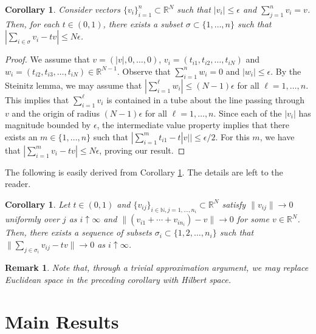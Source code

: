 \documentclass[11pt]{amsart}
\newtheorem{corollary}[theorem]{Corollary}
\newtheorem{remark}[theorem]{Remark}
\begin{document}
\begin{corollary}\label{ST_corollary}
Consider vectors $\{v_{i} \}_{i=1}^{n} \subset \mathbb{R}^{N}$ such that $|v_{i}|\leq \epsilon$ and
$\sum_{j=1}^{n}v_{i} = v$. Then, for each $t\in (0,1)$, there exists a subset $\sigma \subset \{1,\ldots,n \}$ such that
$| \sum_{i \in \sigma} v_{i} - tv | \leq N \epsilon$.
\end{corollary}
\begin{proof}
We assume that $v=(|v|,0,\ldots,0)$, $v_{i} = (t_{i1},t_{i2},\ldots,t_{iN})$ 
and $w_{i} = (t_{i2},t_{i3}, \ldots, t_{iN}) \in \mathbb{R}^{N-1}$.  Observe that $\sum_{i=1}^{n}w_{i} = 0$ and $|w_{i}|\leq \epsilon$.
By the Steinitz lemma, we may assume that $|\sum_{i=1}^{\ell}w_{i}|\leq (N-1)\epsilon$ for all $\ell =1,\ldots,n$.
This implies that $\sum_{i=1}^{\ell}v_{i}$ is contained in a tube about the line passing through $v$ and the origin
of radius $(N-1)\epsilon$ for all $\ell = 1,\ldots,n$.  Since each of the $|v_{i}|$ has magnitude bounded by $\epsilon$,
the intermediate value property implies that there exists an $m \in \{1,\ldots,n \}$ such that 
$|\sum_{i=1}^{m}t_{i1} - t|v|| \leq \epsilon/2$.  For this $m$, we have that $|\sum_{i=1}^{m} v_{i} - tv| \leq N\epsilon$,
proving our result.
\end{proof}

The following is easily derived from Corollary \ref{ST_corollary}.  The details are left to the reader.

\begin{corollary}\label{ST_euclidean}
Let $t\in (0,1)$ and $\{v_{ij} \}_{i\in\mathbb{N}, j=1,\ldots,n_{i}} \subset \mathbb{R}^{N}$ satisfy
$\|v_{ij}\| \rightarrow 0$ uniformly over $j$ as $i\uparrow \infty$ and $\|(v_{i1} + \cdots + v_{in_{i}}) - v \| \rightarrow 0$ for some $v\in \mathbb{R}^{N}$.
Then, there exists a sequence of subsets $\sigma_{i} \subset \{1,2,\ldots,n_{i} \}$ such that $\|\sum_{j\in \sigma_{i}} v_{ij} - tv \| \rightarrow 0$ as $i\uparrow \infty$.
\end{corollary}

\begin{remark}\label{ST_hilbert}
Note that, through a trivial approximation argument, we may replace Euclidean space in the preceding corollary with Hilbert space.
\end{remark}



\section{Main Results}
\end{document}
